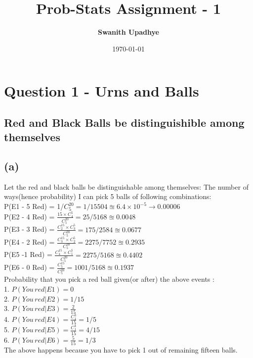 \documentclass[11pt]{article}
\title{Prob-Stats Assignment - 1}
\author{\textbf{\Large Swanith Upadhye}}
\date{\today}
\begin{document}
	
	\maketitle
	\Large
	
\section*{\color{teal} Question 1 - Urns and Balls}

	\subsection*{Red and Black Balls be distinguishible among themselves}
	\subsection*{(a)}
	
	Let the red and black balls be distinguishable among themselves:
	The number of ways(hence probability) I can pick 5 balls of following combinations:\\
	P(E1 - 5 Red) = 1/\(C^{20}_{5}=1/15504\approxeq 6.4\times10^{-5} \rightarrow 0.00006\)\\
	P(E2 - 4 Red) = \(\frac{15 \times C^5_4}{C^{20}_5}=25/5168 \approxeq 0.0048\)\\
	P(E3 - 3 Red) = \(\frac{C^{15}_{2} \times C^5_3}{C^{20}_5}=175/2584 \approxeq 0.0677\)\\
	P(E4 - 2 Red) = \(\frac{C^{15}_{3} \times C^5_2}{C^{20}_5}=2275/7752\approxeq0.2935\)\\
	P(E5 -1 Red) = \(\frac{C^{15}_{4} \times C^5_1}{C^{20}_5}=2275/5168 \approxeq 0.4402\)\\
	P(E6 - 0 Red) = \(\frac{C^{15}_{5}}{C^{20}_5}=1001/5168\approxeq 0.1937\)\\
	
	Probability that you pick a red ball given(or after) the above events :\\
	1. \(P(You\,red|E1)= 0\)\\
	2. \( P(You\, red|E2) =  1/15\)\\
	3. \( P(You\, red|E3) =  \frac{2}{15}\)\\
    4. \( P(You\, red|E4) =  \frac{C^3_1}{15}=1/5\)\\
    5. \( P(You\, red|E5) =  \frac{C^4_1}{15}=4/15\)\\
    6. \( P(You\, red|E6) =  \frac{5}{15}=1/3\)\\
	
	The above happens because you have to pick 1 out of remaining fifteen balls.
	    
\end{document}
